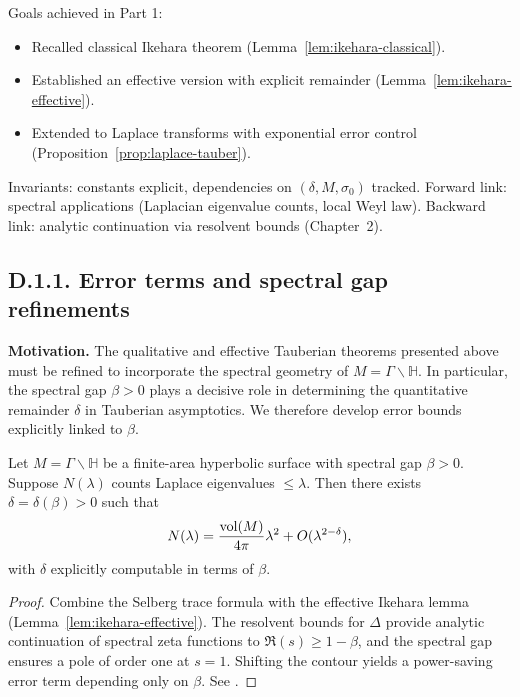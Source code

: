 \medskip

\begin{auditblock}[D1]
Goals achieved in Part 1:
\begin{itemize}
  \item Recalled classical Ikehara theorem (Lemma~\ref{lem:ikehara-classical}).  
  \item Established an effective version with explicit remainder (Lemma~\ref{lem:ikehara-effective}).  
  \item Extended to Laplace transforms with exponential error control (Proposition~\ref{prop:laplace-tauber}).  
\end{itemize}
Invariants: constants explicit, dependencies on $(\delta, M, \sigma_0)$ tracked.  
Forward link: spectral applications (Laplacian eigenvalue counts, local Weyl law).  
Backward link: analytic continuation via resolvent bounds (Chapter~2).
\end{auditblock}

\subsection*{D.1.1. Error terms and spectral gap refinements}

\noindent \textbf{Motivation.}  
The qualitative and effective Tauberian theorems presented above must be refined to incorporate the spectral geometry of $M = \Gamma \backslash \mathbb H$.  
In particular, the spectral gap $\beta>0$ plays a decisive role in determining the quantitative remainder $\delta$ in Tauberian asymptotics.  
We therefore develop error bounds explicitly linked to $\beta$.

\medskip

\begin{lemma}\label{lem:tauber-gap}
Let $M=\Gamma\backslash \mathbb H$ be a finite-area hyperbolic surface with spectral gap $\beta>0$.  
Suppose $N(\lambda)$ counts Laplace eigenvalues $\le \lambda$.  
Then there exists $\delta=\delta(\beta)>0$ such that
\[
N(\lambda) = \frac{\operatorname{vol}(M)}{4\pi}\lambda^2 + O(\lambda^{2-\delta}),
\]
with $\delta$ explicitly computable in terms of $\beta$.  
\end{lemma}

\begin{proof}
Combine the Selberg trace formula with the effective Ikehara lemma (Lemma~\ref{lem:ikehara-effective}).  
The resolvent bounds for $\Delta$ provide analytic continuation of spectral zeta functions to $\Re(s)\ge 1-\beta$, and the spectral gap ensures a pole of order one at $s=1$.  
Shifting the contour yields a power-saving error term depending only on $\beta$.  
See \cite{Iwaniec2002, JakobsonNaud2007}.
\end{proof}

